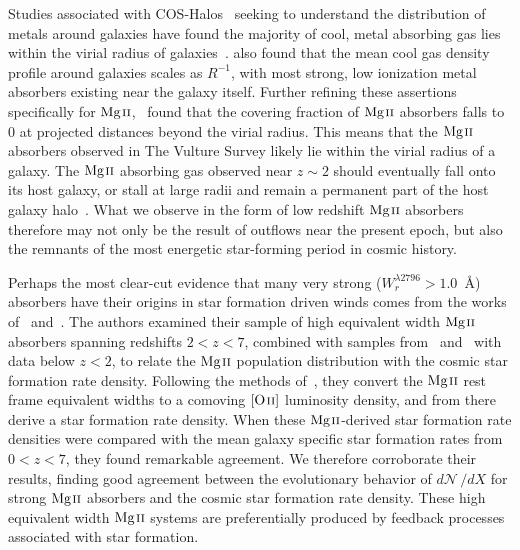 \documentclass[iop,apj,numberedappendix,appendixfloats,twocolappendix]{emulateapj}
\begin{document}
Studies associated with COS-Halos~\citep{Tumlinson2011} seeking to understand the distribution of metals around galaxies have found the majority of cool, metal absorbing gas lies within the virial radius of galaxies~\citep{Peeples2014}. \cite{Stern2016} also found that the mean cool gas density profile around galaxies scales as $R^{-1}$, with most strong, low ionization metal absorbers existing near the galaxy itself. Further refining these assertions specifically for ${\hbox{{\rm Mg}\kern 0.1em{\sc ii}}}$,~\cite{Churchill2013letter} found that the covering fraction of ${\hbox{{\rm Mg}\kern 0.1em{\sc ii}}}$ absorbers falls to $0$ at projected distances beyond the virial radius. This means that the ${\hbox{{\rm Mg}\kern 0.1em{\sc ii}}}$ absorbers observed in The Vulture Survey likely lie within the virial radius of a galaxy. The ${\hbox{{\rm Mg}\kern 0.1em{\sc ii}}}$ absorbing gas observed near $z \sim 2$ should eventually fall onto its host galaxy, or stall at large radii and remain a permanent part of the host galaxy halo~\citep{Oppenheimer2010,Ford2014}. What we observe in the form of low redshift ${\hbox{{\rm Mg}\kern 0.1em{\sc ii}}}$ absorbers therefore may not only be the result of outflows near the present epoch, but also the remnants of the most energetic star-forming period in cosmic history.

Perhaps the most clear-cut evidence that many very strong ($W_r^{\lambda2796} > 1.0$~{\AA}) absorbers have their origins in star formation driven winds comes from the works of~\cite{Matejek2012} and~\cite{Chen2016}. The authors examined their sample of high equivalent width ${\hbox{{\rm Mg}\kern 0.1em{\sc ii}}}$ absorbers spanning redshifts $2 < z < 7$, combined with samples from~\cite{Nestor2005} and~\cite{Prochter2006} with data below $z < 2$, to relate the ${\hbox{{\rm Mg}\kern 0.1em{\sc ii}}}$ population distribution with the cosmic star formation rate density. Following the methods of~\cite{Menard2011}, they convert the ${\hbox{{\rm Mg}\kern 0.1em{\sc ii}}}$ rest frame equivalent widths to a comoving ${\hbox{[{\rm O}\kern 0.1em{\sc ii}]}}$ luminosity density, and from there derive a star formation rate density. When these ${\hbox{{\rm Mg}\kern 0.1em{\sc ii}}}$-derived star formation rate densities were compared with the mean galaxy specific star formation rates from $0 < z < 7$, they found remarkable agreement. We therefore corroborate their results, finding good agreement between the evolutionary behavior of $d\mathcal{N}\,/dX$ for strong ${\hbox{{\rm Mg}\kern 0.1em{\sc ii}}}$ absorbers and the cosmic star formation rate density. These high equivalent width ${\hbox{{\rm Mg}\kern 0.1em{\sc ii}}}$ systems are preferentially produced by feedback processes associated with star formation.
\end{document}
